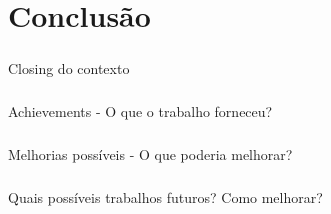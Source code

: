 \chapter{Conclusão}
\label{cap6}

\paragraph{} Closing do contexto

\paragraph{} Achievements - O que o trabalho forneceu?

\paragraph{} Melhorias possíveis - O que poderia melhorar?

\paragraph{} Quais possíveis trabalhos futuros? Como melhorar?